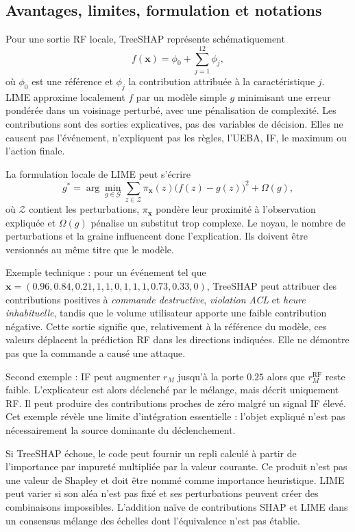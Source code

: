 \documentclass[11pt,a4paper,oneside]{report}
\theoremstyle{definition}
\theoremstyle{plain}
\begin{document}
\subsection*{Avantages, limites, formulation et notations}

Pour une sortie RF locale, TreeSHAP représente schématiquement
\begin{equation}
f(\mathbf{x})=\phi_0+\sum_{j=1}^{12}\phi_j,
\label{eq:ai-ro-shap}
\end{equation}
où $\phi_0$ est une référence et $\phi_j$ la contribution attribuée à la caractéristique $j$. LIME approxime localement $f$ par un modèle simple $g$ minimisant une erreur pondérée dans un voisinage perturbé, avec une pénalisation de complexité. Les contributions sont des sorties explicatives, pas des variables de décision. Elles ne causent pas l'événement, n'expliquent pas les règles, l'UEBA, IF, le maximum ou l'action finale.

La formulation locale de LIME peut s'écrire
\begin{equation}
g^*=\arg\min_{g\in\mathcal{G}}
\sum_{z\in\mathcal{Z}}\pi_{\mathbf{x}}(z)
\bigl(f(z)-g(z)\bigr)^2+\Omega(g),
\label{eq:ai-ro-lime}
\end{equation}
où $\mathcal{Z}$ contient les perturbations, $\pi_{\mathbf{x}}$ pondère leur
proximité à l'observation expliquée et $\Omega(g)$ pénalise un substitut trop
complexe. Le noyau, le nombre de perturbations et la graine influencent donc
l'explication. Ils doivent être versionnés au même titre que le modèle.

Exemple technique : pour un événement tel que
$\mathbf{x}=(0.96,0.84,0.21,1,1,0,1,1,1,0.73,0.33,0)$, TreeSHAP peut attribuer des contributions positives à \emph{commande destructive}, \emph{violation ACL} et \emph{heure inhabituelle}, tandis que le volume utilisateur apporte une faible contribution négative. Cette sortie signifie que, relativement à la référence du modèle, ces valeurs déplacent la prédiction RF dans les directions indiquées. Elle ne démontre pas que la commande a causé une attaque.

Second exemple : IF peut augmenter $r_M$ jusqu'à la porte $0.25$ alors que
$r_M^{\mathrm{RF}}$ reste faible. L'explicateur est alors déclenché par le mélange, mais décrit uniquement RF. Il peut produire des contributions proches de zéro malgré un signal IF élevé. Cet exemple révèle une limite d'intégration essentielle : l'objet expliqué n'est pas nécessairement la source dominante du déclenchement.

Si TreeSHAP échoue, le code peut fournir un repli calculé à partir de l'importance par impureté multipliée par la valeur courante. Ce produit n'est pas une valeur de Shapley et doit être nommé comme importance heuristique. LIME peut varier si son aléa n'est pas fixé et ses perturbations peuvent créer des combinaisons impossibles. L'addition naïve de contributions SHAP et LIME dans un consensus mélange des échelles dont l'équivalence n'est pas établie.
\end{document}

